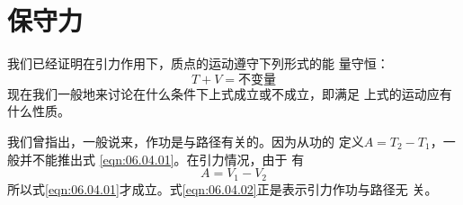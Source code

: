 \section{保守力}\label{sec:06.04}

我们已经证明在引力作用下，质点的运动遵守下列形式的能
量守恒：
\begin{equation}\label{eqn:06.04.01}
  T + V =  \text{不变量}
\end{equation}
现在我们一般地来讨论在什么条件下上式成立或不成立，即满足
上式的运动应有什么性质。

我们曾指出，一般说来，作功是与路径有关的。因为从功的
定义$  A = T _ { 2 } - T _ { 1 }   $，一般并不能推出式 \eqref{eqn:06.04.01}。在引力情况，由于
有
\begin{equation}\label{eqn:06.04.02}
  A = V _ { 1 } - V _ { 2 }
\end{equation}
所以式\eqref{eqn:06.04.01}才成立。式\eqref{eqn:06.04.02}正是表示引力作功与路径无
关。

